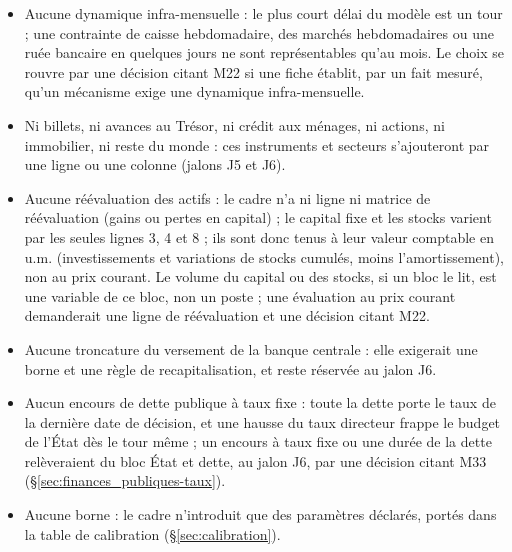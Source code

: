 \documentclass[11pt,a4paper]{article}
\begin{document}
\begin{portee}
\begin{itemize}
\item Aucune dynamique infra-mensuelle : le plus court délai du modèle est un tour ; une contrainte de caisse hebdomadaire, des marchés hebdomadaires ou une ruée bancaire en quelques jours ne sont représentables qu'au mois. Le choix se rouvre par une décision citant M22 si une fiche établit, par un fait mesuré, qu'un mécanisme exige une dynamique infra-mensuelle.
\item Ni billets, ni avances au Trésor, ni crédit aux ménages, ni actions, ni immobilier, ni reste du monde : ces instruments et secteurs s'ajouteront par une ligne ou une colonne (jalons J5 et J6).
\item Aucune réévaluation des actifs : le cadre n'a ni ligne ni matrice de réévaluation (gains ou pertes en capital) ; le capital fixe et les stocks varient par les seules lignes 3, 4 et 8 ; ils sont donc tenus à leur valeur comptable en u.m. (investissements et variations de stocks cumulés, moins l'amortissement), non au prix courant. Le volume du capital ou des stocks, si un bloc le lit, est une variable de ce bloc, non un poste ; une évaluation au prix courant demanderait une ligne de réévaluation et une décision citant M22.
\item Aucune troncature du versement de la banque centrale : elle exigerait une borne et une règle de recapitalisation, et reste réservée au jalon J6.
\item Aucun encours de dette publique à taux fixe : toute la dette porte le taux de la dernière date de décision, et une hausse du taux directeur frappe le budget de l'État dès le tour même ; un encours à taux fixe ou une durée de la dette relèveraient du bloc État et dette, au jalon J6, par une décision citant M33 (\S\ref{sec:finances_publiques-taux}).
\item Aucune borne : le cadre n'introduit que des paramètres déclarés, portés dans la table de calibration (\S\ref{sec:calibration}).
\end{itemize}
\end{portee}

\end{document}
